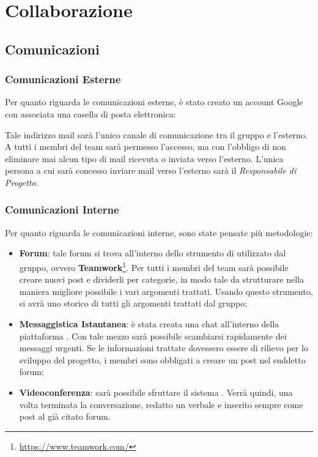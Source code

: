\section{Collaborazione}
\subsection{Comunicazioni}
\subsubsection{Comunicazioni Esterne}

Per quanto riguarda le comunicazioni esterne, è stato creato un account Google con associata una casella di posta elettronica: 
\begin{center}
\GroupEmail
\end{center}
Tale indirizzo mail sarà l'unico canale di comunicazione tra il gruppo e l'esterno. A tutti i membri del team sarà permesso l'accesso, ma con l'obbligo di non eliminare mai alcun tipo di mail ricevuta o inviata verso l'esterno. L'unica persona a cui sarà concesso inviare mail verso l'esterno sarà il \textit{Responsabile di Progetto}.

\subsubsection{Comunicazioni Interne}

Per quanto riguarda le comunicazioni interne, sono state pensate più metodologie:

\begin{itemize}
\item \textbf{Forum}: tale forum si trova all'interno dello strumento di  utilizzato dal gruppo, ovvero \textbf{Teamwork}\footnote[1]{\url{https://www.teamwork.com/}}. Per tutti i membri del team sarà possibile creare nuovi post e dividerli per categorie, in modo tale da strutturare nella maniera migliore possibile i vari argomenti trattati. Usando questo strumento, si avrà uno storico di tutti gli argomenti trattati dal gruppo;
\item \textbf{Messaggistica Istantanea}: è stata creata una chat all'interno della piattaforma . Con tale mezzo sarà possibile scambiarsi rapidamente dei messaggi urgenti. Se le informazioni trattate dovessero essere di rilievo per lo sviluppo del progetto, i membri sono obbligati a creare un post nel suddetto forum;
\item \textbf{Videoconferenza}: sarà possibile sfruttare il sistema . Verrà quindi, una volta terminata la conversazione, redatto un verbale e inserito sempre come post al già citato forum.
\end{itemize}

